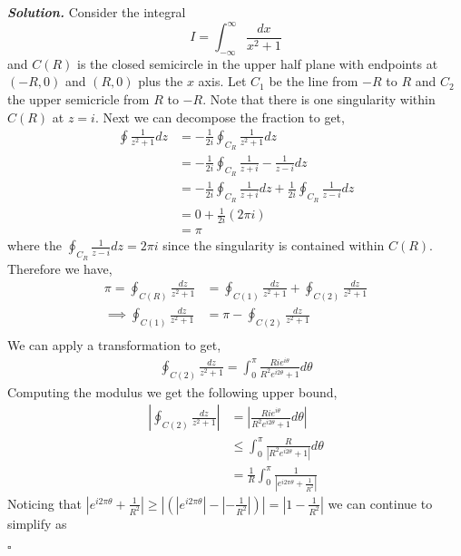 \documentclass[12pt]{report}
\newenvironment{solution}[1][\it{Solution}]{\textbf{#1. } }{$\square$}
\begin{document}
\begin{solution}
    \noindent
    Consider the integral $$I = \int_{-\infty}^{\infty}\frac{dx}{x^2 + 1}$$ and $C(R)$ is the closed semicircle in the upper half plane with endpoints at $(-R,0)$ and $(R,0)$ plus the $x$ axis. Let $C_1$ be the line from $-R$ to $R$ and $C_2$ the upper semicricle from $R$ to $-R$. Note that there is one singularity within $C(R)$ at $z = i$.
    Next we can decompose the fraction to get,
    \begin{align*}
        \oint \frac{1}{z^2 + 1}dz &= -\frac{1}{2i} \oint_{C_R} \frac{1}{z^2 + 1}dz\\
        &= -\frac{1}{2i} \oint_{C_R} \frac{1}{z + i} - \frac{1}{z - i}dz\\
        &= -\frac{1}{2i} \oint_{C_R} \frac{1}{z + i}dz + \frac{1}{2i} \oint_{C_R}\frac{1}{z - i}dz\\
        &= 0 + \frac{1}{2i}(2\pi i)\\
        &= \pi
    \end{align*}
    where the $\oint_{C_R} \frac{1}{z - i}dz = 2\pi i$ since the singularity is contained within $C(R)$. Therefore we have,
    \begin{align*}
        \pi = \oint_{C(R)} \frac{dz}{z^2 + 1} &= \oint_{C(1)} \frac{dz}{z^2 + 1} + \oint_{C(2)} \frac{dz}{z^2 + 1}\\
        \implies \oint_{C(1)} \frac{dz}{z^2 + 1} &= \pi - \oint_{C(2)} \frac{dz}{z^2 + 1}\\
    \end{align*}
    We can apply a transformation to get,
    \begin{align*}
        \oint_{C(2)} \frac{dz}{z^2 + 1} = \int_0^\pi \frac{Rie^{i\theta}}{R^2e^{i2\theta} + 1}d\theta
    \end{align*}
    Computing the modulus we get the following upper bound,
    \begin{align*}
        \left| \oint_{C(2)}\frac{dz}{z^2 + 1}\right| &= \left| \frac{Rie^{i\theta}}{R^2e^{i2\theta} + 1}d\theta \right|\\
        &\leq \int_0^\pi \frac{R}{\left|R^2 e^{i2\theta} + 1\right|}d\theta\\
        &= \frac{1}{R} \int_0^\pi \frac{1}{\left|e^{i2\pi\theta} + \frac{1}{R^2}\right|}
    \end{align*}
    Noticing that $\left|e^{i2\pi\theta} + \frac{1}{R^2}\right| \geq \left|\left( \left|e^{i2\pi\theta}\right| - \left| - \frac{1}{R^2}\right|\right) \right| = \left| 1 - \frac{1}{R^2}\right|$ we can continue to simplify as

\end{solution}
\end{document}
